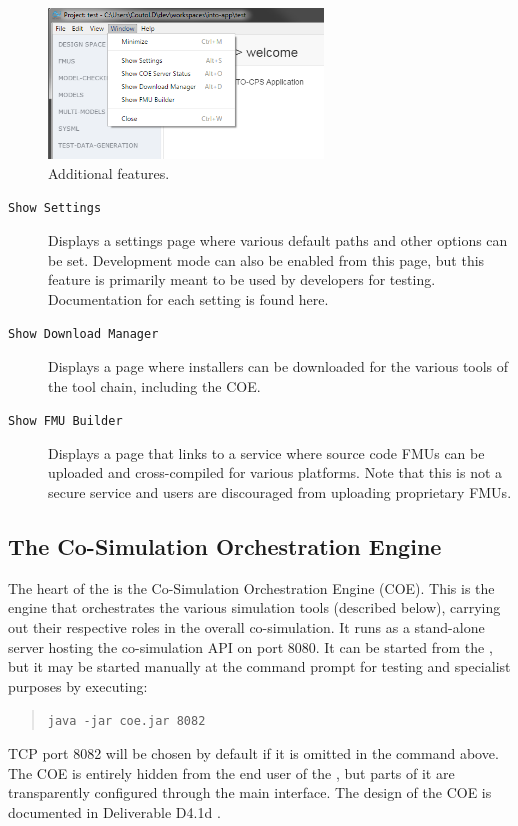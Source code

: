 \begin{figure}[h!]
\centering
\includegraphics[width=0.65\textwidth]{./figures/app/other-features}
\caption{Additional features.}
\label{fig:other-features}
\end{figure}

\begin{description}
  \item[\texttt{Show Settings}] Displays a settings page where various default
    paths and other options can be set. Development mode can also be enabled from this page, but
    this feature is primarily meant to be used by developers for testing.  Documentation for each setting is found here.
  \item[\texttt{Show Download Manager}] Displays a page where installers can be 
    downloaded for the various tools of the \into tool chain, including the COE.
  \item[\texttt{Show FMU Builder}]  Displays a page that links to a service
    where source code FMUs can be uploaded and cross-compiled for various platforms. Note that this is not a secure service and
    users are discouraged from uploading proprietary FMUs.
\end{description}


\subsection{The Co-Simulation Orchestration Engine}\label{sec:COE}
The heart of the \intoapp{} is the Co-Simulation Orchestration Engine (COE).
%
This is the engine that orchestrates the various simulation tools (described below), carrying out their respective roles in the overall co-simulation.
%
It runs as a stand-alone server hosting the co-simulation API on port 8080.
%
It can be started from the \intoapp{}, but it may be started manually at the command prompt for testing and specialist purposes by executing:
%
%
%
\begin{quote}
\texttt{java -jar coe.jar 8082}
\end{quote}
%
%
%
TCP port 8082 will be chosen by default if it is omitted in the command above.
%
The COE is entirely hidden from the end user of the \intoapp{}, but parts of it are transparently configured through the main interface.
%
The design of the COE is documented in Deliverable D4.1d \cite{INTOCPSD41d}.

